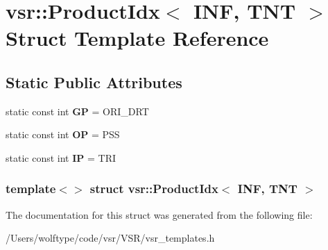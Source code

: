 \hypertarget{structvsr_1_1_product_idx_3_01_i_n_f_00_01_t_n_t_01_4}{\section{vsr\-:\-:Product\-Idx$<$ I\-N\-F, T\-N\-T $>$ Struct Template Reference}
\label{structvsr_1_1_product_idx_3_01_i_n_f_00_01_t_n_t_01_4}
}
\subsection*{Static Public Attributes}
\begin{DoxyCompactItemize}
\item 
\hypertarget{structvsr_1_1_product_idx_3_01_i_n_f_00_01_t_n_t_01_4_a35e1a2619df5e02948be7fc418e4de90}{static const int {\bfseries G\-P} = O\-R\-I\-\_\-\-D\-R\-T}\label{structvsr_1_1_product_idx_3_01_i_n_f_00_01_t_n_t_01_4_a35e1a2619df5e02948be7fc418e4de90}

\item 
\hypertarget{structvsr_1_1_product_idx_3_01_i_n_f_00_01_t_n_t_01_4_a3e9b6d5993fd83d10402fe797b564a12}{static const int {\bfseries O\-P} = P\-S\-S}\label{structvsr_1_1_product_idx_3_01_i_n_f_00_01_t_n_t_01_4_a3e9b6d5993fd83d10402fe797b564a12}

\item 
\hypertarget{structvsr_1_1_product_idx_3_01_i_n_f_00_01_t_n_t_01_4_aa4b783281837d63f9903f35a7197f4f9}{static const int {\bfseries I\-P} = T\-R\-I}\label{structvsr_1_1_product_idx_3_01_i_n_f_00_01_t_n_t_01_4_aa4b783281837d63f9903f35a7197f4f9}

\end{DoxyCompactItemize}
\subsubsection*{template$<$$>$ struct vsr\-::\-Product\-Idx$<$ I\-N\-F, T\-N\-T $>$}



The documentation for this struct was generated from the following file\-:\begin{DoxyCompactItemize}
\item 
/\-Users/wolftype/code/vsr/\-V\-S\-R/vsr\-\_\-templates.\-h\end{DoxyCompactItemize}
